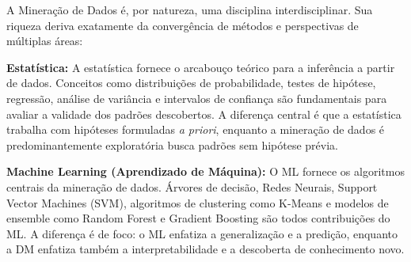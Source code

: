\documentclass[12pt,a4paper]{article}
\begin{document}
\begin{center}
\end{center}

\vspace{0.3cm}

A Mineração de Dados é, por natureza, uma disciplina interdisciplinar. Sua riqueza deriva exatamente da convergência de métodos e perspectivas de múltiplas áreas:

\textbf{Estatística:} A estatística fornece o arcabouço teórico para a inferência a partir de dados. Conceitos como distribuições de probabilidade, testes de hipótese, regressão, análise de variância e intervalos de confiança são fundamentais para avaliar a validade dos padrões descobertos. A diferença central é que a estatística trabalha com hipóteses formuladas \textit{a priori}, enquanto a mineração de dados é predominantemente exploratória busca padrões sem hipótese prévia.

\textbf{Machine Learning (Aprendizado de Máquina):} O ML fornece os algoritmos centrais da mineração de dados. Árvores de decisão, Redes Neurais, Support Vector Machines (SVM), algoritmos de clustering como K-Means e modelos de ensemble como Random Forest e Gradient Boosting são todos contribuições do ML. A diferença é de foco: o ML enfatiza a generalização e a predição, enquanto a DM enfatiza também a interpretabilidade e a descoberta de conhecimento novo.
\end{document}
